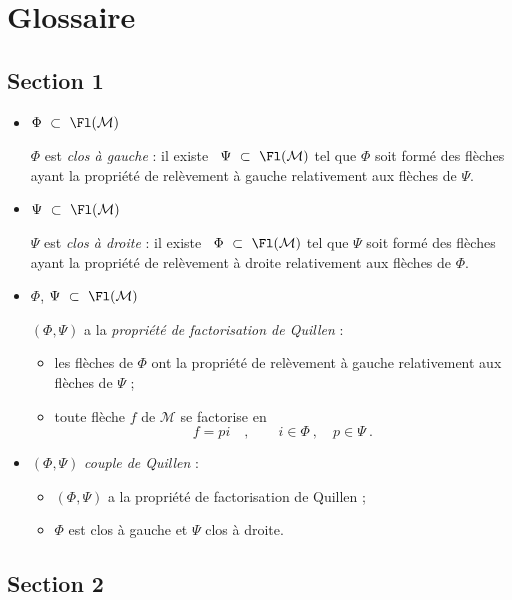 \clearpage


\section*{Glossaire}

\subsection*{Section 1}

\begin{itemize}
\item $\Phi \ \subset\ \Fl(\mathcal{M})$

$\Phi$ est \textit{clos à gauche} : il existe \ $\Psi \ \subset\ \Fl(\mathcal{M})$ tel que $\Phi$ soit formé des flèches ayant la propriété de relèvement à gauche relativement aux flèches de $\Psi$.

\item $\Psi \ \subset\ \Fl(\mathcal{M})$

$\Psi$ est \textit{clos à droite} : il existe \ $\Phi \ \subset\ \Fl(\mathcal{M})$ tel que $\Psi$ soit formé des flèches ayant la propriété de relèvement à droite relativement aux flèches de $\Phi$.

\item $\Phi$, $\Psi \ \subset\ \Fl(\mathcal{M})$

$(\Phi, \Psi)$ a la \textit{propriété de factorisation de Quillen} :
\begin{itemize}
\item[a)] les flèches de $\Phi$ ont la propriété de relèvement à gauche relativement aux flèches de $\Psi$ ;
\item[b)] toute flèche $f$ de $\mathcal{M}$ se factorise en
\[
f = pi \quad , \qquad i \in \Phi \ , \quad p \in \Psi \ .
\]
\end{itemize}

\item $(\Phi, \Psi)$ \textit{couple de Quillen} :
\begin{itemize}
\item[a)] $(\Phi, \Psi)$ a la propriété de factorisation de Quillen ;
\item[b)] $\Phi$ est clos à gauche et $\Psi$ clos à droite.
\end{itemize}
\end{itemize}

\subsection*{Section 2}

